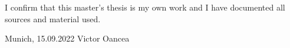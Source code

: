 \thispagestyle{empty}
\vspace*{0.8\textheight}
\noindent
I confirm that this master's thesis is my own work and I have documented all sources and material used.

\vspace{15mm}
\noindent
Munich, 15.09.2022 \hspace{50mm} Victor Oancea{}


\cleardoublepage{}

